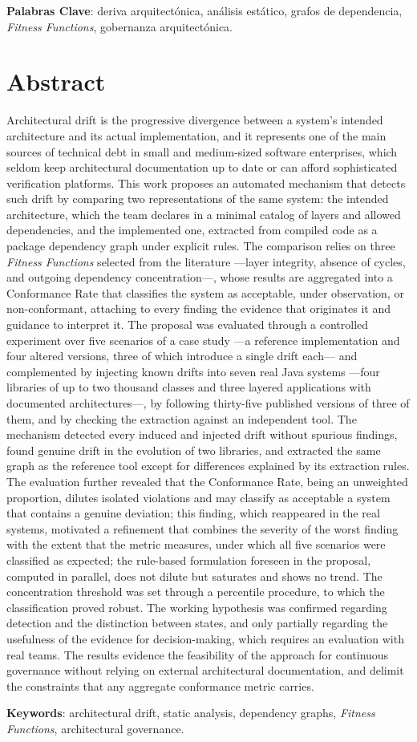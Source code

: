 {\bf Palabras Clave}: deriva arquitectónica, análisis estático, grafos de dependencia, \textit{Fitness Functions}, gobernanza arquitectónica.

\chapter*{Abstract}
Architectural drift is the progressive divergence between a system's intended architecture and its actual implementation, and it represents one of the main sources of technical debt in small and medium-sized software enterprises, which seldom keep architectural documentation up to date or can afford sophisticated verification platforms. This work proposes an automated mechanism that detects such drift by comparing two representations of the same system: the intended architecture, which the team declares in a minimal catalog of layers and allowed dependencies, and the implemented one, extracted from compiled code as a package dependency graph under explicit rules. The comparison relies on three \textit{Fitness Functions} selected from the literature ---layer integrity, absence of cycles, and outgoing dependency concentration---, whose results are aggregated into a Conformance Rate that classifies the system as acceptable, under observation, or non-conformant, attaching to every finding the evidence that originates it and guidance to interpret it. The proposal was evaluated through a controlled experiment over five scenarios of a case study ---a reference implementation and four altered versions, three of which introduce a single drift each--- and complemented by injecting known drifts into seven real Java systems ---four libraries of up to two thousand classes and three layered applications with documented architectures---, by following thirty-five published versions of three of them, and by checking the extraction against an independent tool. The mechanism detected every induced and injected drift without spurious findings, found genuine drift in the evolution of two libraries, and extracted the same graph as the reference tool except for differences explained by its extraction rules. The evaluation further revealed that the Conformance Rate, being an unweighted proportion, dilutes isolated violations and may classify as acceptable a system that contains a genuine deviation; this finding, which reappeared in the real systems, motivated a refinement that combines the severity of the worst finding with the extent that the metric measures, under which all five scenarios were classified as expected; the rule-based formulation foreseen in the proposal, computed in parallel, does not dilute but saturates and shows no trend. The concentration threshold was set through a percentile procedure, to which the classification proved robust. The working hypothesis was confirmed regarding detection and the distinction between states, and only partially regarding the usefulness of the evidence for decision-making, which requires an evaluation with real teams. The results evidence the feasibility of the approach for continuous governance without relying on external architectural documentation, and delimit the constraints that any aggregate conformance metric carries.

{\bf Keywords}: architectural drift, static analysis, dependency graphs, \textit{Fitness Functions}, architectural governance.
